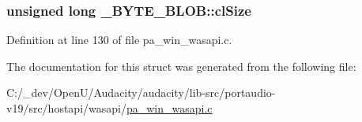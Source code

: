 \subsubsection[{\texorpdfstring{cl\+Size}{clSize}}]{\setlength{\rightskip}{0pt plus 5cm}unsigned long \+\_\+\+B\+Y\+T\+E\+\_\+\+B\+L\+O\+B\+::cl\+Size}\hypertarget{struct___b_y_t_e___b_l_o_b_a13be4b59f9b0a4142143e52fede86481}{}\label{struct___b_y_t_e___b_l_o_b_a13be4b59f9b0a4142143e52fede86481}


Definition at line 130 of file pa\+\_\+win\+\_\+wasapi.\+c.



The documentation for this struct was generated from the following file\+:\begin{DoxyCompactItemize}
\item 
C\+:/\+\_\+dev/\+Open\+U/\+Audacity/audacity/lib-\/src/portaudio-\/v19/src/hostapi/wasapi/\hyperlink{pa__win__wasapi_8c}{pa\+\_\+win\+\_\+wasapi.\+c}\end{DoxyCompactItemize}
